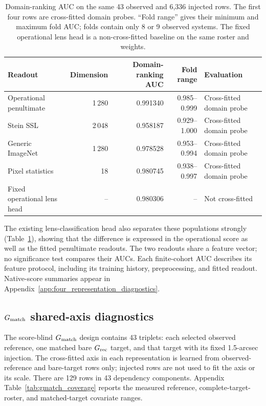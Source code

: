 \begin{table}
\caption{Domain-ranking AUC on the same 43 observed and 6,336 injected rows.
The first four rows are cross-fitted domain probes. ``Fold range'' gives their
minimum and maximum fold AUC; folds contain only 8 or 9 observed systems. The
fixed operational lens head is a non-cross-fitted baseline on the same roster
and weights.}
\label{tab:gdomain_four_rep}
\centering
\begin{tabular}{lrrrl}
\toprule
Readout & Dimension & Domain-ranking AUC & Fold range & Evaluation \\
\midrule
Operational penultimate & 1\,280 & 0.991340 & 0.985--0.999 &
Cross-fitted domain probe \\
Stein SSL & 2\,048 & 0.958187 & 0.929--1.000 &
Cross-fitted domain probe \\
Generic ImageNet & 1\,280 & 0.978528 & 0.953--0.994 &
Cross-fitted domain probe \\
Pixel statistics & 18 & 0.980745 & 0.938--0.997 &
Cross-fitted domain probe \\
\midrule
Fixed operational lens head & -- & 0.980306 & -- &
Not cross-fitted \\
\bottomrule
\end{tabular}
\end{table}

The existing lens-classification head also separates these populations
strongly (Table~\ref{tab:gdomain_four_rep}), showing that the difference is
expressed in the operational score as well as the fitted penultimate readouts.
The two readouts share a feature vector; no significance test compares their
AUCs. Each finite-cohort AUC describes its feature protocol, including its
training history, preprocessing, and fitted readout. Native-score summaries appear in
Appendix~\ref{app:four_representation_diagnostics}.

\subsection{\(G_{\rm match}\) shared-axis diagnostics}
\label{sec:matched_probe_results}

The score-blind \(G_{\rm match}\) design contains 43 triplets: each selected
observed reference, one matched bare \(G_{\rm rec}\) target, and that target with
its fixed 1.5-arcsec injection. The cross-fitted axis in each representation
is learned from observed-reference and bare-target rows only; injected rows are
not used to fit the axis or its scale. There are 129 rows in 43 dependency
components. Appendix Table~\ref{tab:gmatch_coverage} reports the measured
reference, complete-target-roster, and matched-target covariate ranges.

